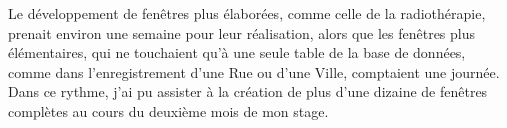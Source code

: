 Le développement de fenêtres plus élaborées, comme celle de la radiothérapie, prenait environ une semaine pour leur réalisation, alors que les fenêtres plus élémentaires, qui ne touchaient qu'à une seule table de la base de données, comme dans l'enregistrement d'une Rue ou d'une Ville, comptaient une journée. Dans ce rythme, j'ai pu assister à la création de plus d'une dizaine de fenêtres complètes au cours du deuxième mois de mon stage.